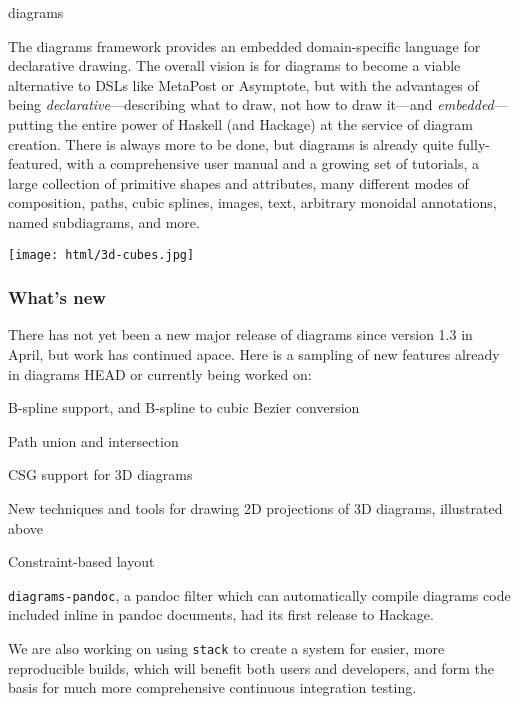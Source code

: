 \begin{hcarentry}[updated]{diagrams}
\makeheader

The diagrams framework provides an embedded domain-specific language
for declarative drawing.  The overall vision is for diagrams to become
a viable alternative to DSLs like MetaPost or Asymptote, but with the
advantages of being \emph{declarative}---describing what to draw, not
how to draw it---and \emph{embedded}---putting the entire power of
Haskell (and Hackage) at the service of diagram creation.  There is
always more to be done, but diagrams is already quite fully-featured,
with a comprehensive user manual and a growing set of tutorials, a
large collection of primitive shapes and attributes, many different
modes of composition, paths, cubic splines, images, text, arbitrary
monoidal annotations, named subdiagrams, and more.

\begin{center}
\texttt{[image: html/3d-cubes.jpg]}
\end{center}

\subsubsection*{What's new}

There has not yet been a new major release of diagrams since version
1.3 in April, but work has continued apace. Here is a sampling of new
features already in diagrams HEAD or currently being worked on:
\begin{compactitem}
\item B-spline support, and B-spline to cubic Bezier conversion
\item Path union and intersection
\item CSG support for 3D diagrams
\item New techniques and tools for drawing 2D projections of 3D
  diagrams, illustrated above
\item Constraint-based layout
\end{compactitem}

\texttt{diagrams-pandoc}, a pandoc filter which can automatically
compile diagrams code included inline in pandoc documents, had its
first release to Hackage.

We are also working on using \texttt{stack} to create a system for
easier, more reproducible builds, which will benefit both users and
developers, and form the basis for much more comprehensive continuous
integration testing.


\end{hcarentry}
